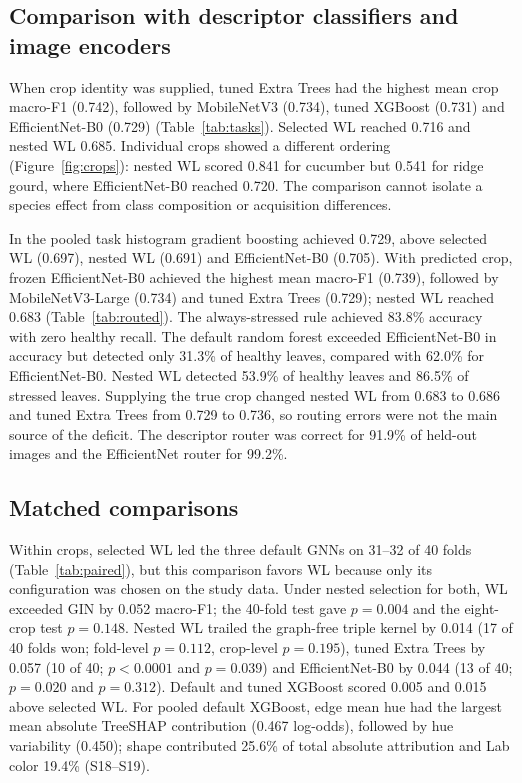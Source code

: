 \subsection{Comparison with descriptor classifiers and image encoders}
When crop identity was supplied, tuned Extra Trees had the highest mean crop macro-F1 (0.742), followed by MobileNetV3 (0.734), tuned XGBoost (0.731) and EfficientNet-B0 (0.729) (Table~\ref{tab:tasks}). Selected WL reached 0.716 and nested WL 0.685. Individual crops showed a different ordering (Figure~\ref{fig:crops}): nested WL scored 0.841 for cucumber but 0.541 for ridge gourd, where EfficientNet-B0 reached 0.720. The comparison cannot isolate a species effect from class composition or acquisition differences.
\showpanel{\croppanel}

In the pooled task histogram gradient boosting achieved 0.729, above selected WL (0.697), nested WL (0.691) and EfficientNet-B0 (0.705). With predicted crop, frozen EfficientNet-B0 achieved the highest mean macro-F1 (0.739), followed by MobileNetV3-Large (0.734) and tuned Extra Trees (0.729); nested WL reached 0.683 (Table~\ref{tab:routed}). The always-stressed rule achieved 83.8\% accuracy with zero healthy recall. The default random forest exceeded EfficientNet-B0 in accuracy but detected only 31.3\% of healthy leaves, compared with 62.0\% for EfficientNet-B0. Nested WL detected 53.9\% of healthy leaves and 86.5\% of stressed leaves. Supplying the true crop changed nested WL from 0.683 to 0.686 and tuned Extra Trees from 0.729 to 0.736, so routing errors were not the main source of the deficit. The descriptor router was correct for 91.9\% of held-out images and the EfficientNet router for 99.2\%.
\showpanel{\tasktable}
\showpanel{\routedtable}

\subsection{Matched comparisons}
Within crops, selected WL led the three default GNNs on 31--32 of 40 folds (Table~\ref{tab:paired}), but this comparison favors WL because only its configuration was chosen on the study data. Under nested selection for both, WL exceeded GIN by 0.052 macro-F1; the 40-fold test gave $p=0.004$ and the eight-crop test $p=0.148$. Nested WL trailed the graph-free triple kernel by 0.014 (17 of 40 folds won; fold-level $p=0.112$, crop-level $p=0.195$), tuned Extra Trees by 0.057 (10 of 40; $p<0.0001$ and $p=0.039$) and EfficientNet-B0 by 0.044 (13 of 40; $p=0.020$ and $p=0.312$). Default and tuned XGBoost scored 0.005 and 0.015 above selected WL. For pooled default XGBoost, edge mean hue had the largest mean absolute TreeSHAP contribution (0.467 log-odds), followed by hue variability (0.450); shape contributed 25.6\% of total absolute attribution and Lab color 19.4\% (S18--S19).
\showpanel{\pairedtable}

